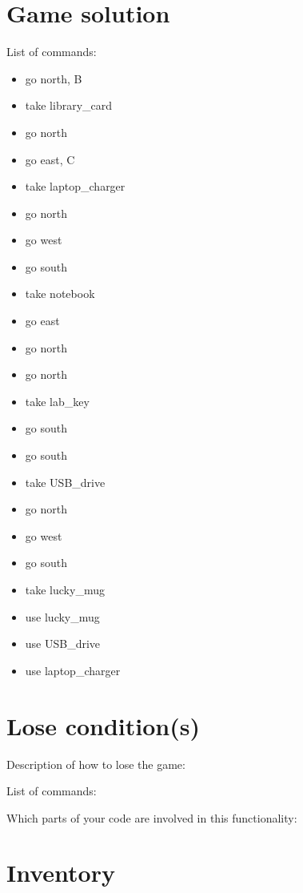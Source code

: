 \documentclass[11pt]{article}
\begin{document}
\section*{Game solution}
List of commands:
\begin{itemize}
    \item go north, B
    \item take library\_card
    \item go north
    \item go east, C
    \item take laptop\_charger
    \item go north
    \item go west
    \item go south
    \item take notebook
    \item go east
    \item go north
    \item go north
    \item take lab\_key
    \item go south
    \item go south
    \item take USB\_drive
    \item go north
    \item go west
    \item go south
    \item take lucky\_mug
    \item use lucky\_mug
    \item use USB\_drive
    \item use laptop\_charger
\end{itemize}

\section*{Lose condition(s)}
Description of how to lose the game:

List of commands:

Which parts of your code are involved in this functionality:


\section*{Inventory}
\end{document}
